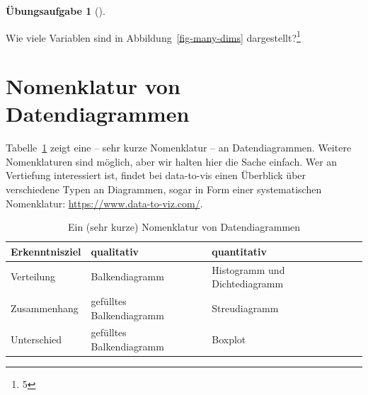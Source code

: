 \documentclass[
  letterpaper,
]{scrbook}
\theoremstyle{definition}
\theoremstyle{definition}
\theoremstyle{definition}
\newtheorem{exercise}{Übungsaufgabe}[chapter]
\theoremstyle{remark}
\begin{document}
\begin{exercise}[]\protect\hypertarget{exr-anz-dims}{}\label{exr-anz-dims}

Wie viele Variablen sind in Abbildung~\ref{fig-many-dims}
dargestellt?\footnote{5}

\end{exercise}

\section{Nomenklatur von
Datendiagrammen}\label{nomenklatur-von-datendiagrammen}

Tabelle~\ref{tbl-nom-plots} zeigt eine -- sehr kurze Nomenklatur -- an
Datendiagrammen. Weitere Nomenklaturen sind möglich, aber wir halten
hier die Sache einfach. Wer an Vertiefung interessiert ist, findet bei
data-to-vis einen Überblick über verschiedene Typen an Diagrammen, sogar
in Form einer systematischen Nomenklatur:
\url{https://www.data-to-viz.com/}.

\begin{longtable}[]{@{}
  >{\raggedright\arraybackslash}p{}
  >{\raggedright\arraybackslash}p{}
  >{\raggedright\arraybackslash}p{}@{}}

\caption{\label{tbl-nom-plots}Ein (sehr kurze) Nomenklatur von
Datendiagrammen}

\tabularnewline

\toprule\noalign{}
\begin{minipage}[b]{\linewidth}\raggedright
Erkenntnisziel
\end{minipage} & \begin{minipage}[b]{\linewidth}\raggedright
qualitativ
\end{minipage} & \begin{minipage}[b]{\linewidth}\raggedright
quantitativ
\end{minipage} \\
\midrule\noalign{}
\endhead
\bottomrule\noalign{}
\endlastfoot
Verteilung & Balkendiagramm & Histogramm und Dichtediagramm \\
Zusammenhang & gefülltes Balkendiagramm & Streudiagramm \\
Unterschied & gefülltes Balkendiagramm & Boxplot \\

\end{longtable}
\end{document}
